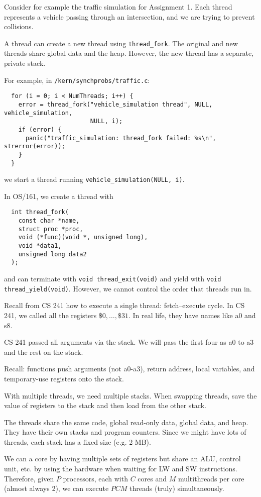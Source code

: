 Consider for example the traffic simulation for Assignment 1.
Each thread represents a vehicle passing through an intersection,
and we are trying to prevent collisions.

A thread can create a new thread using \verb|thread_fork|.
The original and new threads share global data and the heap.
However, the new thread has a separate, private stack.

For example, in \texttt{/kern/synchprobs/traffic.c}:
\begin{verbatim}
  for (i = 0; i < NumThreads; i++) {
    error = thread_fork("vehicle_simulation thread", NULL, vehicle_simulation,
                        NULL, i);
    if (error) {
      panic("traffic_simulation: thread_fork failed: %s\n", strerror(error));
    }
  }
\end{verbatim}
we start a thread running \texttt{vehicle_simulation(NULL, i)}.

In OS/161, we create a thread with
\begin{verbatim}
  int thread_fork(
    const char *name,
    struct proc *proc,
    void (*func)(void *, unsigned long),
    void *data1,
    unsigned long data2
  );
\end{verbatim}
and can terminate with \texttt{void thread_exit(void)}
and yield with \texttt{void thread_yield(void)}.
However, we cannot control the order that threads run in.

Recall from CS 241 how to execute a single thread:
fetch--execute cycle.
In CS 241, we called all the registers $\$0,\dotsc,\$31$.
In real life, they have names like a0 and s8.

CS 241 passed all arguments via the stack.
We will pass the first four as a0 to a3 and the rest on the stack.

Recall: functions push arguments (not a0-a3),
return address, local variables, and temporary-use registers onto the stack.

With multiple threads, we need multiple stacks.
When swapping threads, save the value of registers to the stack
and then load from the other stack.

The threads share the same code, global read-only data, global data, and heap.
They have their own stacks and program counters.
Since we might have lots of threads, each stack has a fixed size (e.g. 2 MB).

We can  a core by having multiple sets of registers
but share an ALU, control unit, etc. by using the hardware when waiting for LW and SW instructions.
Therefore, given $P$ processors, each with $C$ cores and $M$ multithreads per core (almost always 2),
we can execute $PCM$ threads (truly) simultaneously.

